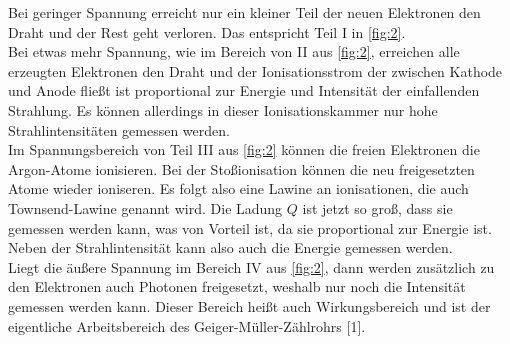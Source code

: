 Bei geringer Spannung erreicht nur ein kleiner Teil der neuen Elektronen den Draht und der Rest geht verloren. Das entspricht Teil I in \autoref{fig:2}.\\ 
Bei etwas mehr Spannung, wie im Bereich von II aus \autoref{fig:2}, erreichen alle erzeugten Elektronen den Draht und der Ionisationsstrom der zwischen Kathode und Anode fließt ist proportional zur Energie und Intensität der einfallenden Strahlung. Es können allerdings in dieser Ionisationskammer nur hohe Strahlintensitäten gemessen werden.\\
Im Spannungsbereich von Teil III aus \autoref{fig:2} können die freien Elektronen die Argon-Atome ionisieren. Bei der Stoßionisation können die neu freigesetzten Atome wieder ioniseren. Es folgt also eine Lawine an ionisationen, die auch Townsend-Lawine genannt wird. Die Ladung $Q$ ist jetzt so groß, dass sie gemessen werden kann, was von Vorteil ist, da sie proportional zur Energie ist. Neben der Strahlintensität kann also auch die Energie gemessen werden. \\
Liegt die äußere Spannung im Bereich IV aus \autoref{fig:2}, dann werden zusätzlich zu den Elektronen auch Photonen freigesetzt, weshalb nur noch die Intensität gemessen werden kann. Dieser Bereich heißt auch Wirkungsbereich und ist der eigentliche Arbeitsbereich des Geiger-Müller-Zählrohrs [1].


